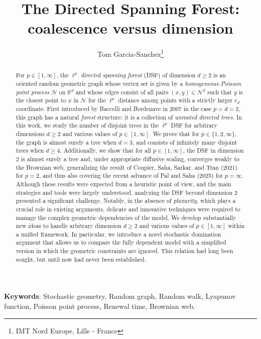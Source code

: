 \documentclass[a4paper, 11pt]{article}
\theoremstyle{plain}
\theoremstyle{definition}
\newcommand{\R}{\mathbb{R}}
\numberwithin{equation}{section}
\begin{document}
\title{The Directed Spanning Forest: coalescence versus dimension}
\author{Tom Garcia-Sanchez\footnote{IMT Nord Europe, Lille - France}}
\maketitle

\begin{abstract}
For $p\in[1,\infty]$, the $\ell^p$ \emph{directed spanning forest} (DSF) of dimension $d\geq 2$ is an oriented random geometric graph whose vertex set is given by a \emph{homogeneous Poisson point process} $\mathcal N$ on $\R^d$ and whose edges consist of all pairs $(x, y)\in\mathcal N^2$ such that $y$ is the closest point to $x$ in $\mathcal N$ for the $\ell^p$ distance among points with a strictly larger $e_d$ coordinate. First introduced by Baccelli and Bordenave in 2007 in the case $p=d=2$, this graph has a natural \emph{forest} structure: it is a collection of \emph{unrooted directed trees}. In this work, we study the number of disjoint trees in the $\ell^p$ DSF for arbitrary dimensions $d\geq2$ and various values of $p\in [1,\infty]$. We prove that for $p\in\{1, 2,\infty\}$, the graph is almost surely a tree when $d=3$, and consists of infinitely many disjoint trees when $d\geq 4$. Additionally, we show that for all $p\in[1,\infty]$, the DSF in dimension $2$ is almost surely a tree and, under appropriate diffusive scaling, converges weakly to the Brownian web, generalizing the result of Coupier, Saha, Sarkar, and Tran (2021) for $p=2$, and thus also covering the recent advance of Pal and Saha (2025) for $p=\infty$. Although these results were expected from a heuristic point of view, and the main strategies and tools were largely understood, analyzing the DSF beyond dimension 2 presented a significant challenge. Notably, in the absence of \emph{planarity}, which plays a crucial role in existing arguments, delicate and innovative techniques were required to manage the complex geometric dependencies of the model. We develop substantially new ideas to handle arbitrary dimension $d\geq2$ and various values of $p\in [1,\infty]$ within a unified framework. In particular, we introduce a novel stochastic domination argument that allows us to compare the fully dependent model with a simplified version in which the geometric constraints are ignored. This relation had long been sought, but until now had never been established.
\end{abstract}

\textbf{Keywords}: Stochastic geometry, Random graph, Random walk, Lyapunov function, Poisson point process, Renewal time, Brownian web.
\end{document}
